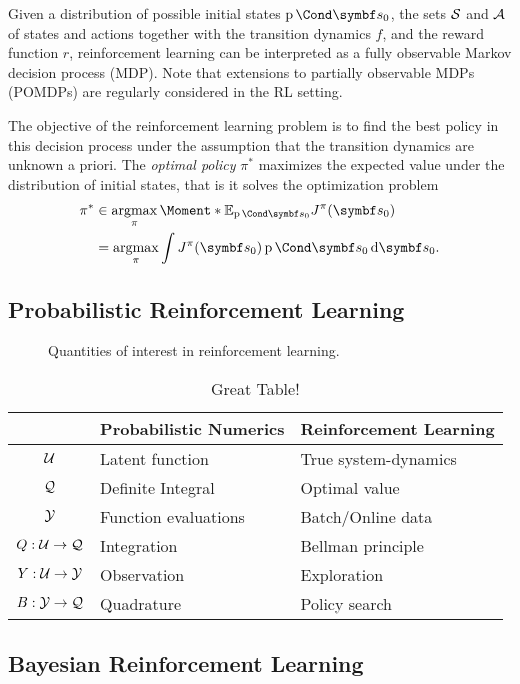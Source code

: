 Given a distribution of possible initial states $\Prob{\mat{s}_0}$, the sets $\mathcal{S}$ and $\mathcal{A}$ of states and actions together with the transition dynamics $f$, and the reward function $r$, reinforcement learning can be interpreted as a fully observable Markov decision process (MDP).
Note that extensions to partially observable MDPs (POMDPs) are regularly considered in the RL setting.

The objective of the reinforcement learning problem is to find the best policy in this decision process under the assumption that the transition dynamics are unknown a priori.
The \emph{optimal policy} $\pi^*$ maximizes the expected value under the distribution of initial states, that is it solves the optimization problem
\begin{align}
    \label{eq:optimal_policy}
    \begin{split}
        \pi^\ast &\in \argmax_{\pi} \Moment*{\E_{\Prob{\mat{s}_0}}}{J^\pi(\mat{s}_0)} \\
        &= \argmax_{\pi} \int J^\pi(\mat{s}_0) \Prob{\mat{s}_0} \diff \mat{s}_0.
    \end{split}
\end{align}


\subsection{Probabilistic Reinforcement Learning}
\label{sub:probabilistic_reinforcement_learning}
\begin{figure}[t]
    \centering
    
    \caption[Quantities of interest in reinforcement learning]{
        Quantities of interest in reinforcement learning.
        \label{fig:quantities_of_interest_rl}
    }
\end{figure}
\begin{table}[t]
    \centering
    \caption{Great Table!}
    \label{tab:label}
    \begin{tabularx}{\textwidth}{cYY}
        \toprule
        & Probabilistic Numerics & Reinforcement Learning \\
        \midrule
        $\mathcal{U}$ & Latent function & True system-dynamics \\
        $\mathcal{Q}$ & Definite Integral & Optimal value \\
        $\mathcal{Y}$ & Function evaluations & Batch/Online data \\
        \midrule
        $Q : \mathcal{U} \to \mathcal{Q}$ & Integration & Bellman principle \\
        $Y : \mathcal{U} \to \mathcal{Y}$ & Observation & Exploration \\
        $B : \mathcal{Y} \to \mathcal{Q}$ & Quadrature & Policy search \\
        \bottomrule
    \end{tabularx}
\end{table}


\subsection{Bayesian Reinforcement Learning}
\label{sub:bayesian_reinforcement_learning}


\nocite{*}
\printbibliography

